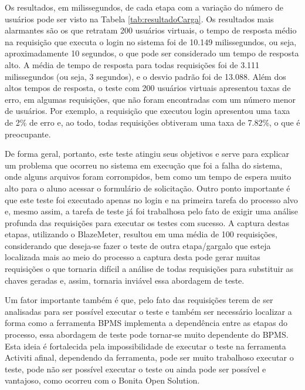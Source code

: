 \documentclass[12pt]{article}
\begin{document}

Os resultados, em milissegundos, de cada etapa com a variação do número de usuários pode ser visto na Tabela \ref{tab:resultadoCarga}. Os resultados mais alarmantes são os que retratam 200 usuários virtuais, o tempo de resposta médio na requisição que executa o login no sistema foi de 10.149 milissegundos, ou seja, aproximadamente 10 segundos, o que pode ser considerado um tempo de resposta alto. A média de tempo de resposta para todas requisições foi de 3.111 milissegundos (ou seja, 3 segundos), e o desvio padrão foi de 13.088. Além dos altos tempos de resposta, o teste com 200 usuários virtuais apresentou taxas de erro, em algumas requisições, que não foram encontradas com um número menor de usuários. Por exemplo, a requisição que executou login apresentou uma taxa de 2\% de erro e, ao todo, todas requisições obtiveram uma taxa de 7.82\%, o que é preocupante.

De forma geral, portanto, este teste atingiu seus objetivos e serve para explicar um problema que ocorreu no sistema em execução que foi a falha do sistema, onde alguns arquivos foram corrompidos, bem como um tempo de espera muito alto para o aluno acessar o formulário de solicitação. Outro ponto importante é que este teste foi executado apenas no login e na primeira tarefa do processo alvo e, mesmo assim, a tarefa de teste já foi trabalhosa pelo fato de exigir uma análise profunda das requisições para executar os testes com sucesso. A captura destas etapas, utilizando o BlazeMeter, resultou em uma média de 100 requisições, considerando que deseja-se fazer o teste de outra etapa/gargalo que esteja localizada mais ao meio do processo a captura desta pode gerar muitas requisições o que tornaria difícil a análise de todas requisições para substituir as chaves geradas e, assim, tornaria inviável essa abordagem de teste. 

Um fator importante também é que, pelo fato das requisições terem de ser analisadas para ser possível executar o teste e também ser necessário localizar a forma como a ferramenta BPMS implementa a dependência entre as etapas do processo, essa abordagem de teste pode tornar-se muito dependente do BPMS. Esta ideia é fortalecida pela impossibilidade de executar o teste na ferramenta Activiti afinal, dependendo da ferramenta, pode ser muito trabalhoso executar o teste, pode não ser possível executar o teste ou ainda pode ser possível e vantajoso, como ocorreu com o Bonita Open Solution.
\end{document}
